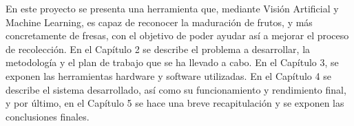 En este proyecto se presenta una herramienta que, mediante Visión Artificial y Machine Learning, es capaz de reconocer la maduración de frutos, y más concretamente de fresas, con el objetivo de poder ayudar así a mejorar el proceso de recolección. En el Capítulo 2 se describe el problema a desarrollar, la metodología y el plan de trabajo que se ha llevado a cabo. En el Capítulo 3, se exponen las herramientas hardware y software utilizadas. En el Capítulo 4 se describe el sistema desarrollado, así como su funcionamiento y rendimiento final, y por último, en el Capítulo 5 se hace una breve recapitulación y se exponen las conclusiones finales.




